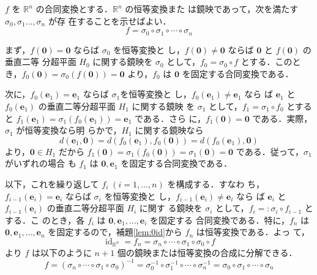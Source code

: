 \documentclass[11pt, uplatex, dvipdfmx, titlepage]{jsarticle}
\makeatletter
\DeclareMathOperator{\id}{id}
\renewenvironment{proof}[1][\proofname]{\par
  \pushQED{\qed}%
  \normalfont \topsep6\p@\@plus6\p@\relax
  \trivlist
  \item[\hskip\labelsep
         \bfseries
    {#1}]\ignorespaces
}{%
  \popQED\endtrivlist\@endpefalse
}
\theoremstyle{definition}
\renewcommand{\proofname}{\textbf{証明}}
\makeatother
\begin{document}
\begin{proof}
  $f$ を $\mathbb{R}^n$ の合同変換とする．$\mathbb{R}^n$ の恒等変換また
  は鏡映であって，次を満たす $\sigma_0, \sigma_1 \ldots, \sigma_n$ が存
  在することを示せばよい．
  \[
    f=\sigma_0 \circ \sigma_1 \circ \cdots \circ \sigma_n
  \]

  まず，$f(\bm{0}) = \bm{0}$ ならば $\sigma_0$ を恒等変換と
  し，$f(\bm{0}) \neq \bm{0}$ ならば $\bm{0}$ と $f(\bm{0})$ の垂直二等
  分超平面 $H_0$ に関する鏡映を $\sigma_0$ として，$f_0=\sigma_0 \circ
  f$
  とする．このとき，$f_0(\bm{0}) = \sigma_0 \left( f(\bm{0})\right) =
  \bm{0}$ より，$f_0$ は $\bm{0}$ を固定する合同変換である．
  
  次に，$f_0(\bm{e}_1) = \bm{e}_1$ ならば $\sigma_1$を恒等変換と
  し，$f_0(\bm{e}_1) \neq \bm{e}_1$ なら
  ば $\bm{e}_1$ と$f_0(\bm{e}_1)$ の垂直二等分超平面 $H_1$ に関する鏡映
  を $\sigma_1$ として，$f_1=\sigma_1 \circ f_0$ とする
  と $f_1(\bm{e}_1) = \sigma_1(f_0(\bm{e}_1)) = \bm{e}_1$ である．さら
  に，$f_1(\bm{0}) = \bm{0}$ である．実際，$\sigma_1$ が恒等変換なら明
  らかで，$H_1$ に関する鏡映なら
  \[
    d(\bm{e}_1, \bm{0}) = d\left(f_0(\bm{e}_1), f_0(\bm{0})\right)
    = d\left( f_0(\bm{e}_1), \bm{0}\right)
  \]
  より，$\bm{0} \in H_1$ だから
  $f_1(\bm{0}) = \sigma_1 \left( f_0(\bm{0})\right) = \sigma_1(\bm{0})
  = \bm{0}$ である．従って，$\sigma_1$ がいずれの場合
  も $f_1$ は $\bm{0}, \bm{e}_1$ を固定する合同変換である．

  以下，これを繰り返して $f_i \; ( i=1, \ldots, n)$ を構成する．すなわ
  ち，$f_{i-1}(\bm{e}_i) = \bm{e}_i$ ならば $\sigma_i$ を恒等変換と
  し，$f_{i-1}(\bm{e}_i) \neq \bm{e}_i$ なら
  ば $\bm{e}_i$ と $f_{i-1}(\bm{e}_i)$ の垂直二等分超平面 $H_i$ に関す
  る鏡映を $\sigma_i$ として，$f_i=:\sigma_i \circ f_{i-1}$ とする．こ
  のとき，各 $f_i$ は $\bm{0}, \bm{e}_1, \ldots, \bm{e}_{i}$ を固定する
  合同変換である．特に，$f_n$ は $\bm{0}, \bm{e}_1, \ldots, \bm{e}_n$
  を固定するので，補題\ref{lem:0id}から $f_n$ は恒等変換である．よっ
  て，
  \[
    \id_{\mathbb{R}^n} =  f_n = \sigma_n \circ  \cdots \circ \sigma_1 \circ \sigma_0 \circ f
  \]
  より $f$ は以下のように $n+1$ 個の鏡映または恒等変換の合成に分解できる．
  \[
    f = \left( \sigma_n \circ \cdots \circ \sigma_1 \circ \sigma_0\right)^{-1}
    = \sigma_0^{-1} \circ \sigma_1^{-1} \circ \cdots \circ \sigma_n^{-1}
    = \sigma_0 \circ \sigma_1 \circ \cdots \circ \sigma_n
  \]
\end{proof}



\newpage
\end{document}
